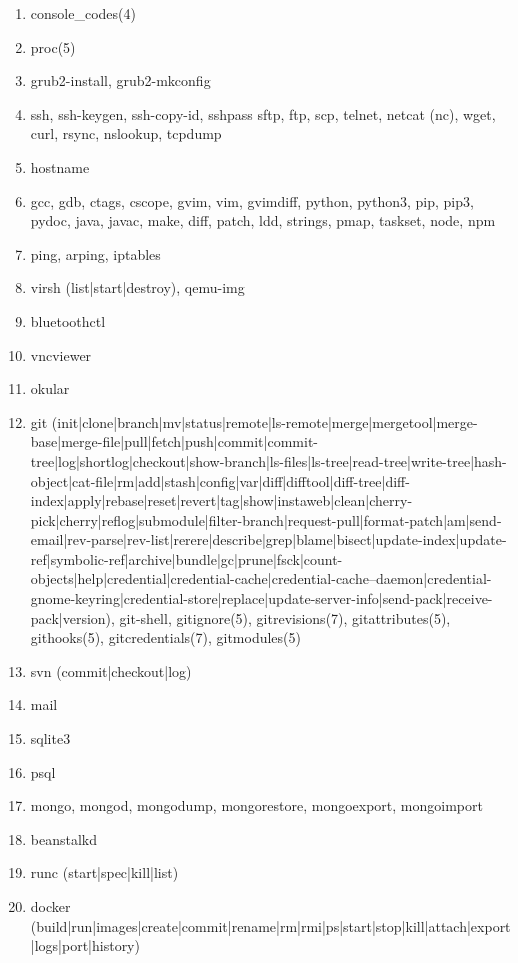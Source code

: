 \documentclass{article}
\begin{document}
\begin{enumerate}
\begin{enumerate}
            \item console_codes(4)
            \item proc(5)
            \item grub2-install, grub2-mkconfig
            \item ssh, ssh-keygen, ssh-copy-id, sshpass sftp, ftp, scp, telnet, netcat (nc), wget, curl, rsync, nslookup, tcpdump
            \item hostname
            \item gcc, gdb, ctags, cscope, gvim, vim, gvimdiff, python, python3, pip, pip3, pydoc, java, javac, make, diff, patch, ldd, strings, pmap, taskset, node, npm
            \item ping, arping, iptables
            \item virsh (list|start|destroy), qemu-img
            \item bluetoothctl
            \item vncviewer
            \item okular
            \item git (init|clone|branch|mv|status|remote|ls-remote|merge|mergetool|merge-base|merge-file|pull|fetch|push|commit|commit-tree|log|shortlog|checkout|show-branch|ls-files|ls-tree|read-tree|write-tree|hash-object|cat-file|rm|add|stash|config|var|diff|difftool|diff-tree|diff-index|apply|rebase|reset|revert|tag|show|instaweb|clean|cherry-pick|cherry|reflog|submodule|filter-branch|request-pull|format-patch|am|send-email|rev-parse|rev-list|rerere|describe|grep|blame|bisect|update-index|update-ref|symbolic-ref|archive|bundle|gc|prune|fsck|count-objects|help|credential|credential-cache|credential-cache--daemon|credential-gnome-keyring|credential-store|replace|update-server-info|send-pack|receive-pack|version), git-shell, gitignore(5), gitrevisions(7), gitattributes(5), githooks(5), gitcredentials(7), gitmodules(5)
            \item svn (commit|checkout|log)
            \item mail
            \item sqlite3
            \item psql
            \item mongo, mongod, mongodump, mongorestore, mongoexport, mongoimport
            \item beanstalkd
            \item runc (start|spec|kill|list)
            \item docker (build|run|images|create|commit|rename|rm|rmi|ps|start|stop|kill|attach|export|logs|port|history)

\end{enumerate}
\end{enumerate}
\end{document}
